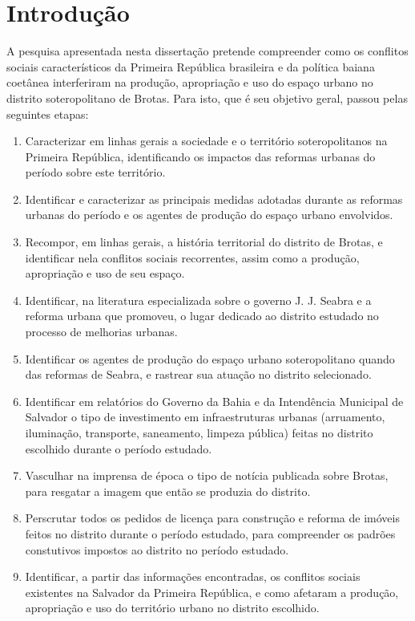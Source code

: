 \chapter[Introdução]{Introdução}\label{ch:intro}

A pesquisa apresentada nesta dissertação pretende compreender como os conflitos sociais característicos da Primeira República brasileira e da política baiana coetânea interferiram na produção, apropriação e uso do espaço urbano no distrito soteropolitano de Brotas. Para isto, que é seu objetivo geral, passou pelas seguintes etapas:

\begin{enumerate}
\item Caracterizar em linhas gerais a sociedade e o território soteropolitanos na Primeira República, identificando os impactos das reformas urbanas do período sobre este território.
\item Identificar e caracterizar as principais medidas adotadas durante as reformas urbanas do período e os agentes de produção do espaço urbano envolvidos.
\item Recompor, em linhas gerais, a história territorial do distrito de Brotas, e identificar nela conflitos sociais recorrentes, assim como a produção, apropriação e uso de seu espaço.
\item Identificar, na literatura especializada sobre o governo J. J. Seabra e a reforma urbana que promoveu, o lugar dedicado ao distrito estudado no processo de melhorias urbanas.
\item Identificar os agentes de produção do espaço urbano soteropolitano quando das reformas de Seabra, e rastrear sua atuação no distrito selecionado.
\item Identificar em relatórios do Governo da Bahia e da Intendência Municipal de Salvador o tipo de investimento em infraestruturas urbanas (arruamento, iluminação, transporte, saneamento, limpeza pública) feitas no distrito escolhido durante o período estudado.
\item Vasculhar na imprensa de época o tipo de notícia publicada sobre Brotas, para resgatar a imagem que então se produzia do distrito.
\item Perscrutar todos os pedidos de licença para construção e reforma de imóveis feitos no distrito durante o período estudado, para compreender os padrões constutivos impostos ao distrito no período estudado.
\item Identificar, a partir das informações encontradas, os conflitos sociais existentes na Salvador da Primeira República, e como afetaram a produção, apropriação e uso do território urbano no distrito escolhido.
\end{enumerate}

